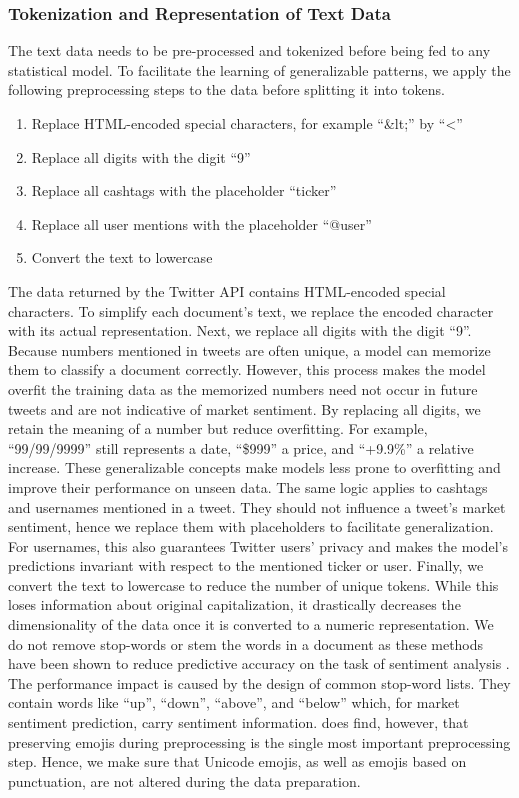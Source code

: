 \subsubsection{Tokenization and Representation of Text Data}
The text data needs to be pre-processed and tokenized before being fed to any statistical model. To facilitate the learning of generalizable patterns, we apply the following preprocessing steps to the data before splitting it into tokens.
\begin{enumerate}[noitemsep]
	\item Replace HTML-encoded special characters, for example ``\&lt;'' by ``<''
	\item Replace all digits with the digit ``9''
	\item Replace all cashtags with the placeholder ``ticker''
	\item Replace all user mentions with the placeholder ``@user''
	\item Convert the text to lowercase
\end{enumerate}

The data returned by the Twitter API contains HTML-encoded special characters. To simplify each document's text, we replace the encoded character with its actual representation. Next, we replace all digits with the digit ``9''. Because numbers mentioned in tweets are often unique, a model can memorize them to classify a document correctly. However, this process makes the model overfit the training data as the memorized numbers need not occur in future tweets and are not indicative of market sentiment. By replacing all digits, we retain the meaning of a number but reduce overfitting. For example, ``99/99/9999'' still represents a date, ``\$999'' a price, and ``+9.9\%'' a relative increase. These generalizable concepts make models less prone to overfitting and improve their performance on unseen data. The same logic applies to cashtags and usernames mentioned in a tweet. They should not influence a tweet's market sentiment, hence we replace them with placeholders to facilitate generalization. For usernames, this also guarantees Twitter users' privacy and makes the model's predictions invariant with respect to the mentioned ticker or user. Finally, we convert the text to lowercase to reduce the number of unique tokens. While this loses information about original capitalization, it drastically decreases the dimensionality of the data once it is converted to a numeric representation. We do not remove stop-words or stem the words in a document as these methods have been shown to reduce predictive accuracy on the task of sentiment analysis . The performance impact is caused by the design of common stop-word lists. They contain words like ``up'', ``down'', ``above'', and ``below'' which, for market sentiment prediction, carry sentiment information.  does find, however, that preserving emojis during preprocessing is the single most important preprocessing step. Hence, we make sure that Unicode emojis, as well as emojis based on punctuation, are not altered during the data preparation.

